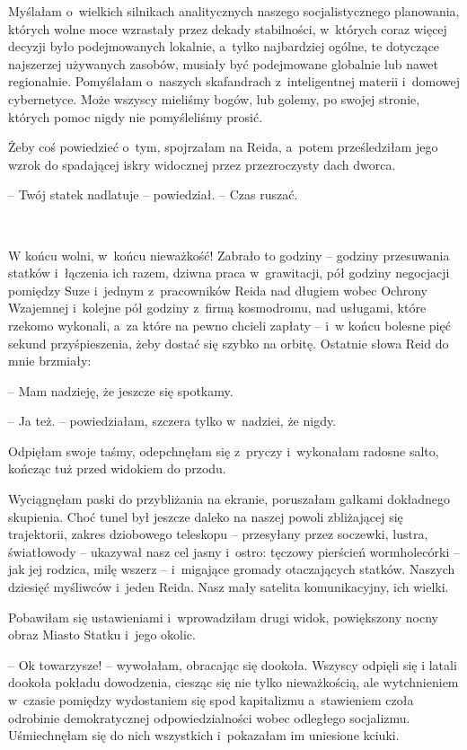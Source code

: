\documentclass[oneside,polish,11pt,sfheadings]{mwbk}
\begin{document}
Myślałam o~wielkich silnikach analitycznych naszego socjalistycznego
planowania, których wolne moce wzrastały przez dekady stabilności, w~których coraz więcej decyzji było podejmowanych lokalnie, a~tylko
najbardziej ogólne, te dotyczące najszerzej używanych zasobów, musiały
być podejmowane globalnie lub nawet regionalnie. Pomyślałam o~naszych
skafandrach z~inteligentnej materii i~domowej cybernetyce. Może wszyscy
mieliśmy bogów, lub golemy, po swojej stronie, których pomoc nigdy nie
pomyśleliśmy prosić.

Żeby coś powiedzieć o~tym, spojrzałam na Reida, a~potem prześledziłam
jego wzrok do spadającej iskry widocznej przez przezroczysty dach
dworca.

-- Twój statek nadlatuje -- powiedział. -- Czas ruszać.

~

W końcu wolni, w~końcu nieważkość! Zabrało to godziny -- godziny
przesuwania statków i~łączenia ich razem, dziwna praca w~grawitacji, pół
godziny negocjacji pomiędzy Suze i~jednym z~pracowników Reida nad
długiem wobec Ochrony Wzajemnej i~kolejne pół godziny z~firmą
kosmodromu, nad usługami, które rzekomo wykonali, a~za które na pewno
chcieli zapłaty -- i~w końcu bolesne pięć sekund przyśpieszenia, żeby
dostać się szybko na orbitę. Ostatnie słowa Reid do mnie brzmiały: 

-- Mam
nadzieję, że jeszcze się spotkamy.

-- Ja też. -- powiedziałam, szczera tylko w~nadziei, że nigdy.

Odpięłam swoje taśmy, odepchnęłam się z~pryczy i~wykonałam radosne
salto, kończąc tuż przed widokiem do przodu.

Wyciągnęłam paski do przybliżania na ekranie, poruszałam gałkami
dokładnego skupienia. Choć tunel był jeszcze daleko na naszej powoli
zbliżającej się trajektorii, zakres dziobowego teleskopu -- przesyłany
przez soczewki, lustra, światłowody -- ukazywał nasz cel jasny i~ostro:
tęczowy pierścień wormhole\dywiz córki -- jak jej rodzica, milę wszerz -- i~migające gromady otaczających statków. Naszych dziesięć myśliwców i~jeden Reida. Nasz mały satelita komunikacyjny, ich wielki.

Pobawiłam się ustawieniami i~wprowadziłam drugi widok, powiększony nocny
obraz Miasto Statku i~jego okolic.

-- Ok towarzysze! -- wywołałam, obracając się dookoła. Wszyscy odpięli się
i latali dookoła pokładu dowodzenia, ciesząc się nie tylko nieważkością,
ale wytchnieniem w~czasie pomiędzy wydostaniem się spod kapitalizmu a~stawieniem czoła odrobinie demokratycznej odpowiedzialności wobec
odległego socjalizmu. Uśmiechnęłam się do nich wszystkich i~pokazałam im
uniesione kciuki.
\end{document}
